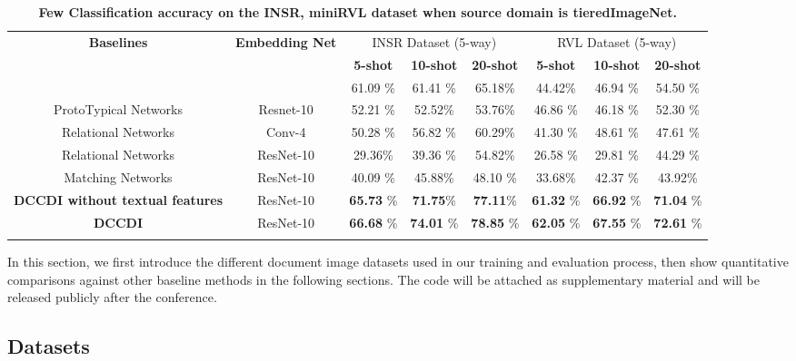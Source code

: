 \begin{table*}[ht]
{\begin{tabular}{cccccccc}
\toprule
     \multirow{3}{*}{\textbf{Baselines}} &   \multirow{3}{*}{\textbf{  Embedding Net }} & \multicolumn{3}{c}{INSR Dataset (5-way)}&\multicolumn{3}{c}{RVL Dataset (5-way)}\\
        & & \textbf{ 5-shot} & \textbf{10-shot} & \textbf{20-shot}  & \textbf{5-shot} & \textbf{10-shot} & \textbf{20-shot}\\
\midrule
ProtoTypical Networks & Conv-4 & 61.09 \% & 61.41  \% & 65.18\%&44.42\% &46.94 \% & 54.50 \% \\
ProtoTypical Networks & Resnet-10 & 52.21 \% & 52.52\% & 53.76\% & 46.86 \% & 46.18 \% & 52.30 \%\\
Relational Networks   & Conv-4 & 50.28  \% & 56.82 \% & 60.29\%& 41.30  \% & 48.61 \% & 47.61 \%\\
Relational Networks  & ResNet-10 &  29.36\%& 39.36  \%  & 54.82\% & 26.58  \% & 29.81 \% & 44.29 \% \\
Matching Networks    & ResNet-10 &40.09 \% & 45.88\%& 48.10   \%&33.68\% & 42.37 \% & 43.92\%\\
\textbf{DCCDI without textual features}      & ResNet-10& \textbf{65.73} \% & \textbf{71.75}\% & \textbf{77.11}\%& \textbf{61.32} \%  & \textbf{66.92 }\% & \textbf{71.04} \%\\
\textbf{DCCDI}  & ResNet-10 & \textbf{66.68} \% & \textbf{74.01}  \% & \textbf{78.85} \% & \textbf{62.05}  \% & \textbf{67.55}  \% & \textbf{72.61}  \%\\
                \addlinespace[1ex]
            \hline
\bottomrule
\end{tabular}
\caption{\textbf{Few Classification accuracy on the INSR, miniRVL dataset when source domain is tieredImageNet.}}
\label{tab:tieredImageNet}
}
\end{table*}

In this section, we first introduce the different document image datasets used in our training and evaluation process, then show quantitative comparisons against other baseline methods in the following sections. The code will be attached as supplementary material and will be released publicly after the conference.



\subsection{Datasets}

